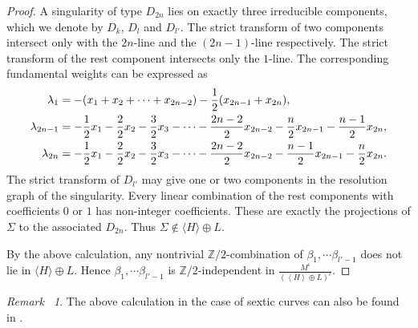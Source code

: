 \documentclass[12pt,reqno,a4paper]{amsart}
\theoremstyle{remark}
\newtheorem{rmk}[thm]{Remark~}
\theoremstyle{definition}
\begin{document}
\begin{proof}
A singularity of type $D_{2n}$ lies on exactly three irreducible components, which we denote by $D_k$, $D_l$ and $D_{l'}$.
The strict transform of two components intersect only with the $2n$-line and the $(2n-1)$-line respectively. 
The strict transform of the rest component intersects only the $1$-line.
The corresponding fundamental weights can be expressed as
\begin{align*}
    \lambda_1 &= -(x_1+x_2+\cdots+x_{2n-2})-{1\over 2}(x_{2n-1}+x_{2n}), \\
    \lambda_{2n-1} &= -{1\over 2}x_1 - {2\over 2}x_2 - {3\over 2}x_3 - \cdots - {2n-2\over 2}x_{2n-2} - {n\over 2}x_{2n-1} - {n-1\over 2}x_{2n}, \\
    \lambda_{2n} &= -{1\over 2}x_1 - {2\over 2}x_2 - {3\over 2}x_3 - \cdots - {2n-2\over 2}x_{2n-2} - {n-1\over 2}x_{2n-1} - {n\over 2}x_{2n}. \\
\end{align*}
The strict transform of $D_{l'}$ may give one or two components in the resolution graph of the singularity.
Every linear combination of the rest components with coefficients $0$ or $1$ has non-integer coefficients.
These are exactly the projections of $\Sigma$ to the associated $D_{2n}$. Thus $\Sigma\notin \langle H\rangle\oplus L$.

    
    
    By the above calculation, any nontrivial $\mathbb{Z}/2$-combination of $\beta_1,\cdots\beta_{l'-1}$ does not lie in $\langle H\rangle\oplus L$.
    Hence $\beta_1,\cdots\beta_{l'-1}$ is $\mathbb{Z}/2$-independent in $\frac{M^{\iota}}{(\left\langle H \right\rangle\oplus L)^{\iota}}$.
\end{proof}
\begin{rmk}
    The above calculation in the case of sextic curves can also be found in \cite[\S 3, Tabel 1]{yang1996sextic}.
\end{rmk}
\end{document}

